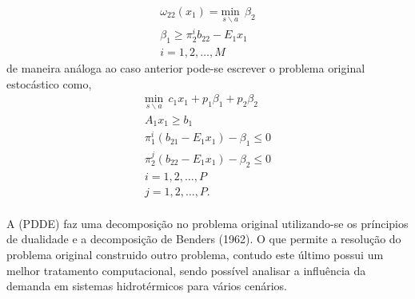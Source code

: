 \documentclass[12pt,fleqn]{article}
\begin{document}
\begin{equation*}
  \begin{aligned}
	{\omega}_{22}(x_1) = \underset {s \backslash a} {\text{min}} \ \ {\beta}_{2} \\
	{\beta}_{1}  \geq {\pi}_{2}^{i}b_{22} - E_1 x_1 \\
	i = 1,2,\dots, M 
  \end{aligned}
\end{equation*}
de maneira an\'aloga ao caso anterior pode-se escrever o problema original estoc\'astico como,
\begin{equation}
  \begin{aligned}
	\underset {s \backslash a} {\text{min}} \ \ c_1x_1 + p_1 {\beta}_{1} + p_2 {\beta}_{2} \\
	A_1 x_1 \geq b_1 \\
	{\pi}_{1}^{i}(b_{21} - E_1x_1) - {\beta}_{1} \leq 0 \\ 
	{\pi}_{2}^{j}(b_{22} - E_1x_1) - {\beta}_{2} \leq 0 \\ 
	i = 1, 2, \dots , P \\
	j = 1, 2, \dots , P. \\
  \end{aligned}
	\label{pd5}
\end{equation}

A (PDDE) faz uma decomposi\c c\~ao no problema original utilizando-se os pr\'incipios de dualidade e a decomposi\c c\~ao
de Benders (1962). O que permite a resolu\c c\~ao do problema original construido outro problema, contudo este
\'ultimo possui um melhor tratamento computacional, sendo poss\'ivel analisar a influ\^encia da demanda em sistemas hidrot\'ermicos para v\'arios cen\'arios.
\end{document}
